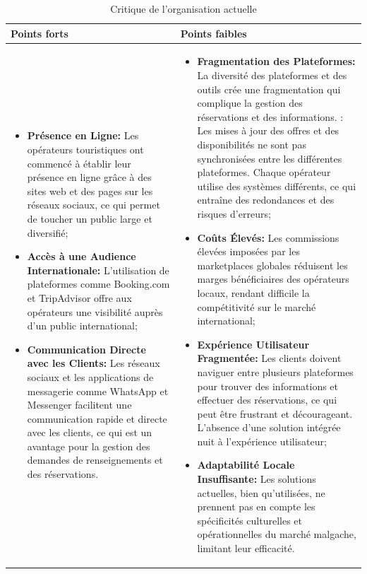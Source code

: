 \documentclass[12pt]{report}
\begin{document}
				\begin{longtable}{|p{7.5cm}|p{7.5cm}|} 
				  \caption{Critique de l'organisation actuelle}
				  \label{tab:Critiqueorganisation}\\
						\hline 
						     \textbf{Points forts} & \textbf{Points faibles}\\
						\hline 
						\endfirsthead 	
						\endhead		
							\begin{itemize}
								\item \textbf{Présence en Ligne:} Les opérateurs touristiques ont commencé à établir leur présence en ligne grâce à des sites web et des pages sur les réseaux sociaux, ce qui permet de toucher un public large et diversifié;
								\item \textbf{Accès à une Audience Internationale:} L'utilisation de plateformes comme Booking.com et TripAdvisor offre aux opérateurs une visibilité auprès d'un public international;
								\item \textbf{Communication Directe avec les Clients:} Les réseaux sociaux et les applications de messagerie comme WhatsApp et Messenger facilitent une communication rapide et directe avec les clients, ce qui est un avantage pour la gestion des demandes de renseignements et des réservations.
							\end{itemize} & 
							\begin{itemize}
								\item \textbf{Fragmentation des Plateformes:} La diversité des plateformes et des outils crée une fragmentation qui complique la gestion des réservations et des informations. : Les mises à jour des offres et des disponibilités ne sont pas synchronisées entre les différentes plateformes. Chaque opérateur utilise des systèmes différents, ce qui entraîne des redondances et des risques d'erreurs;
								\item \textbf{Coûts Élevés:} Les commissions élevées imposées par les marketplaces globales réduisent les marges bénéficiaires des opérateurs locaux, rendant difficile la compétitivité sur le marché international;
								\item \textbf{Expérience Utilisateur Fragmentée:} Les clients doivent naviguer entre plusieurs plateformes pour trouver des informations et effectuer des réservations, ce qui peut être frustrant et décourageant. L'absence d'une solution intégrée nuit à l'expérience utilisateur;
								\item \textbf{Adaptabilité Locale Insuffisante:} Les solutions actuelles, bien qu'utilisées, ne prennent pas en compte les spécificités culturelles et opérationnelles du marché malgache, limitant leur efficacité.
							\end{itemize}\\
						\hline
				\end{longtable}
				\FloatBarrier				
\end{document}

